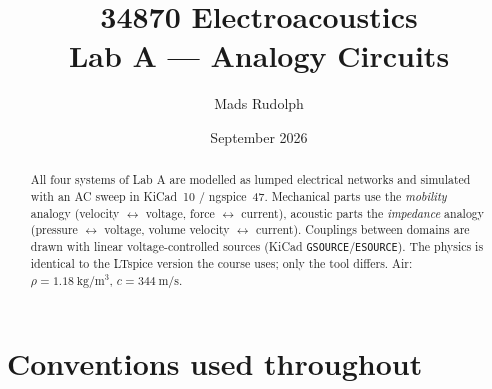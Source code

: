 \documentclass[a4paper,11pt]{article}
\title{34870 Electroacoustics \\ \Large Lab A --- Analogy Circuits}
\author{Mads Rudolph}
\date{September 2026}
\begin{document}
\maketitle

\begin{abstract}
All four systems of Lab A are modelled as lumped electrical networks and simulated with an AC sweep in
KiCad~10 / ngspice~47. Mechanical parts use the \emph{mobility} analogy (velocity $\leftrightarrow$ voltage,
force $\leftrightarrow$ current), acoustic parts the \emph{impedance} analogy (pressure $\leftrightarrow$
voltage, volume velocity $\leftrightarrow$ current). Couplings between domains are drawn with linear
voltage-controlled sources (KiCad \texttt{GSOURCE}/\texttt{ESOURCE}). The physics is identical to the LTspice
version the course uses; only the tool differs. Air: $\rho = \SI{1.18}{\kilo\gram\per\cubic\metre}$,
$c = \SI{344}{\metre\per\second}$.
\end{abstract}

\FloatBarrier
\section*{Conventions used throughout}
\begin{table}[H]\centering\small
{}
\caption{Analogy conventions. In the mobility analogy a mechanical impedance appears as an \emph{admittance}
in the circuit, so $|Z_M|$ is read as $1/|V(u)|$ when the force source is \SI{1}{\ampere}.}
\end{table}
\end{document}
